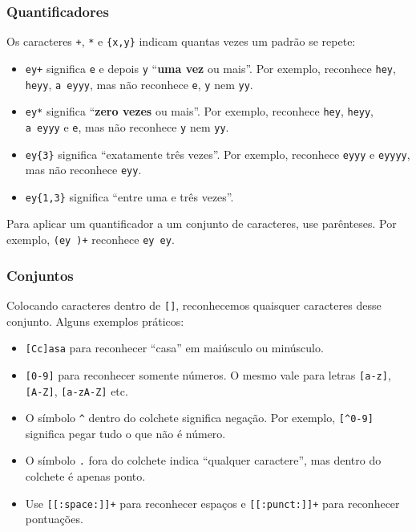 \documentclass[]{book}
\providecommand{\tightlist}{%
  \setlength{\itemsep}{0pt}\setlength{\parskip}{0pt}}
\begin{document}
\subsubsection{Quantificadores}\label{quantificadores}

Os caracteres \texttt{+}, \texttt{*} e \texttt{\{x,y\}} indicam quantas
vezes um padrão se repete:

\begin{itemize}
\tightlist
\item
  \texttt{ey+} significa \texttt{e} e depois \texttt{y} ``\textbf{uma
  vez} ou mais''. Por exemplo, reconhece \texttt{hey}, \texttt{heyy},
  \texttt{a\ eyyy}, mas não reconhece \texttt{e}, \texttt{y} nem
  \texttt{yy}.
\item
  \texttt{ey*} significa ``\textbf{zero vezes} ou mais''. Por exemplo,
  reconhece \texttt{hey}, \texttt{heyy}, \texttt{a\ eyyy} e \texttt{e},
  mas não reconhece \texttt{y} nem \texttt{yy}.
\item
  \texttt{ey\{3\}} significa ``exatamente três vezes''. Por exemplo,
  reconhece \texttt{eyyy} e \texttt{eyyyy}, mas não reconhece
  \texttt{eyy}.
\item
  \texttt{ey\{1,3\}} significa ``entre uma e três vezes''.
\end{itemize}

Para aplicar um quantificador a um conjunto de caracteres, use
parênteses. Por exemplo, \texttt{(ey\ )+} reconhece \texttt{ey\ ey}.

\subsubsection{Conjuntos}\label{conjuntos}

Colocando caracteres dentro de \texttt{{[}{]}}, reconhecemos quaisquer
caracteres desse conjunto. Alguns exemplos práticos:

\begin{itemize}
\tightlist
\item
  \texttt{{[}Cc{]}asa} para reconhecer ``casa'' em maiúsculo ou
  minúsculo.
\item
  \texttt{{[}0-9{]}} para reconhecer somente números. O mesmo vale para
  letras \texttt{{[}a-z{]}}, \texttt{{[}A-Z{]}}, \texttt{{[}a-zA-Z{]}}
  etc.
\item
  O símbolo \texttt{\^{}} dentro do colchete significa negação. Por
  exemplo, \texttt{{[}\^{}0-9{]}} significa pegar tudo o que não é
  número.
\item
  O símbolo \texttt{.} fora do colchete indica ``qualquer caractere'',
  mas dentro do colchete é apenas ponto.
\item
  Use \texttt{{[}{[}:space:{]}{]}+} para reconhecer espaços e
  \texttt{{[}{[}:punct:{]}{]}+} para reconhecer pontuações.
\end{itemize}
\end{document}
